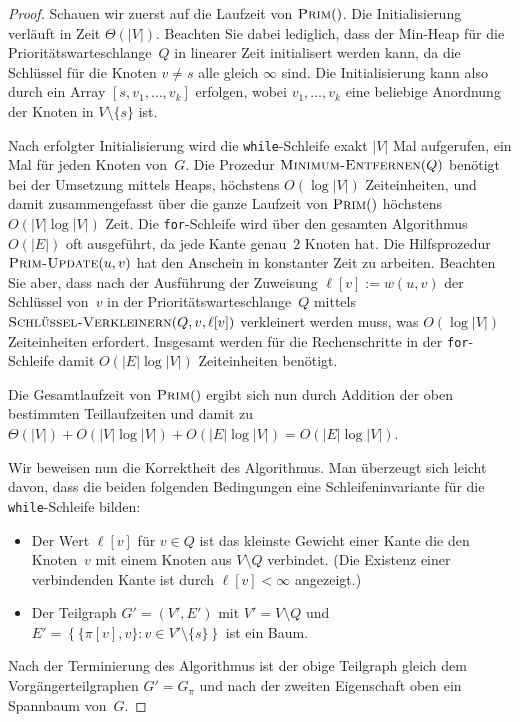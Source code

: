 \begin{proof}
Schauen wir zuerst auf die Laufzeit von $\mathop{\text{\textsc{Prim}}}()$.
Die Initialisierung verläuft in Zeit $\Theta(|V|)$.
Beachten Sie dabei lediglich, dass der Min-Heap für die Prioritätswarteschlange~$Q$ in linearer Zeit initialisert werden kann, da die Schlüssel für die Knoten $v \neq s$ alle gleich $\infty$ sind.
Die Initialisierung kann also durch ein Array $[s,v_1,\ldots,v_k]$ erfolgen, wobei $v_1,\ldots,v_k$ eine beliebige Anordnung der Knoten in $V \setminus \{s\}$ ist.

Nach erfolgter Initialisierung wird die \texttt{while}-Schleife exakt $|V|$ Mal aufgerufen, ein Mal für jeden Knoten von~$G$.
Die Prozedur $\mathop{\text{\textsc{Minimum-Entfernen}}}(Q)$ benötigt bei der Umsetzung mittels Heaps, höchstens $O(\log |V|)$ Zeiteinheiten, und damit zusammengefasst über die ganze Laufzeit von $\mathop{\text{\textsc{Prim}}}()$ höchstens $O(|V|\log|V|)$ Zeit.
Die \texttt{for}-Schleife wird über den gesamten Algorithmus $O(|E|)$ oft ausgeführt, da jede Kante genau~$2$ Knoten hat.
Die Hilfsprozedur $\mathop{\text{\textsc{Prim-Update}}}(u,v)$ hat den Anschein in konstanter Zeit zu arbeiten.
Beachten Sie aber, dass nach der Ausführung der Zuweisung $\ell[v]:=w(u,v)$ der Schlüssel von~$v$ in der Prioritätswarteschlange~$Q$ mittels $\mathop{\text{\textsc{Schlüssel-Verkleinern}}}(Q,v,\ell[v])$ verkleinert werden muss, was $O(\log|V|)$ Zeiteinheiten erfordert.
Insgesamt werden für die Rechenschritte in der \texttt{for}-Schleife damit $O(|E|\log|V|)$ Zeiteinheiten benötigt.

Die Gesamtlaufzeit von $\mathop{\text{\textsc{Prim}}}()$ ergibt sich nun durch Addition der oben bestimmten Teillaufzeiten und damit zu $\Theta(|V|)+O(|V|\log|V|)+O(|E|\log|V|) = O(|E|\log|V|)$.

Wir beweisen nun die Korrektheit des Algorithmus.
Man überzeugt sich leicht davon, dass die beiden folgenden Bedingungen eine Schleifeninvariante für die \texttt{while}-Schleife bilden: 
%
\begin{itemize}
 \item Der Wert $\ell[v]$ für $v \in Q$ ist das kleinste Gewicht einer Kante die den Knoten~$v$ mit einem Knoten aus $V \setminus Q$ verbindet.
 (Die Existenz einer verbindenden Kante ist durch $\ell[v] < \infty$ angezeigt.) 
 \item Der Teilgraph $G'=(V',E')$ mit $V' = V \setminus Q$ und $E' = \left\{\{\pi[v],v\} : v \in V' \setminus \{s\}\right\}$ ist ein Baum. 
\end{itemize}
%
Nach der Terminierung des Algorithmus ist der obige Teilgraph gleich dem Vorgängerteilgraphen $G' = G_\pi$ und nach der zweiten Eigenschaft oben ein Spannbaum von~$G$.


\end{proof}
